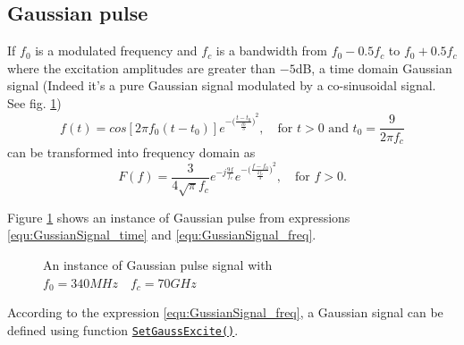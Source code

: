     \subsection{Gaussian pulse} \label{subsec:Gaussian pulse}
If $f_0$ is a modulated frequency and $f_c$ is a bandwidth  from   $f_0-0.5f_c$ to  $f_0+0.5f_c$ where the excitation amplitudes  are greater than $-5$dB, a time domain Gaussian signal (Indeed it's a pure Gaussian signal modulated by a co-sinusoidal signal. See fig. \ref{fig:GaussInpulseTheory})
\begin{equation}\label{equ:GussianSignal_time}
 f(t)=cos[2\pi f_0(t-t_0)]e^{-{\big(\frac{t-t_0}{\frac{t0}{3}}\big)}^2}, \quad \text{for } t>0 \text{ and }t_0=\frac{9}{2\pi f_c}
\end{equation}
can be transformed  into frequency domain as
\begin{equation}\label{equ:GussianSignal_freq}
F(f)=\frac{3}{4\sqrt{\pi}f_c}e^{-j\frac{9f}{f_c}}e^{-{\big(\frac{f-f_0}{\frac{2f_c}{3}}\big)}^2},\quad \text{for } f>0 .
\end{equation}

Figure \ref{fig:GaussInpulseTheory} shows an instance of Gaussian pulse from expressions \ref{equ:GussianSignal_time} and \ref{equ:GussianSignal_freq}. 
    \begin{figure}[hbt]
	      \centering
	      \caption[Gaussian pulse signal]{An instance of Gaussian pulse signal with $f_0=340MHz \quad f_c=70GHz$}
	      \label{fig:GaussInpulseTheory}
    \end{figure}
According to the expression \ref{equ:GussianSignal_freq}, a Gaussian signal can be defined using function \hyperref[func:SetGaussExcite]{\texttt{SetGaussExcite()}}.

